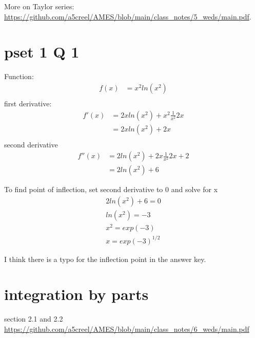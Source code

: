 \documentclass{article}
\begin{document}
More on Taylor series: \url{https://github.com/a5creel/AMES/blob/main/class_notes/5_weds/main.pdf}. 

\section{pset 1 Q 1}
Function: 
\begin{align}
    f(x) &= x^2 ln(x^2)\\
\end{align}
first derivative: 
\begin{align}
    f'(x) &= 2x ln(x^2) + x^2 \frac{1}{x^2}2x\\
    &= 2x ln(x^2) + 2x \\
\end{align}
second derivative
\begin{align}
    f''(x) &= 2ln(x^2) + 2x \frac{1}{x^2} 2x + 2\\
    &= 2ln(x^2) + 6
\end{align}

To find point of inflection, set second derivative to 0 and solve for x
\begin{align}
    2ln(x^2) + 6 = 0\\
    ln(x^2) = -3 \\
    x^2 = exp(-3) \\
    x = exp(-3)^{1/2}
\end{align}

I think there is a typo for the inflection point in the answer key. 

\section{integration by parts }
section 2.1 and 2.2 \url{https://github.com/a5creel/AMES/blob/main/class_notes/6_weds/main.pdf}
\end{document}
